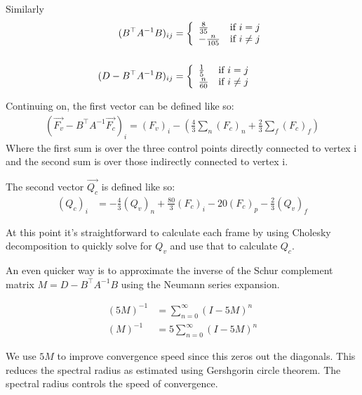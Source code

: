 \documentclass{article}
\begin{document}
Similarly
\begin{align*}
(B^{\top}A^{-1}B)_{ij} &= \left\{ 
  \begin{array}{l l}
    \frac{8}{35} & \text{if $i=j$}\\
    -\frac{n}{105} & \text{if $i\neq j$}\\
  \end{array} \right.  \\
  \\
(D-B^{\top}A^{-1}B)_{ij} &= \left\{ 
  \begin{array}{l l}
    \frac{1}{5} & \text{if $i=j$}\\
    \frac{n}{60} & \text{if $i\neq j$}\\
  \end{array} \right.  \\
\end{align*}

Continuing on, the first vector can be defined like so:
\begin{align*}
\left( \vec{F_v} - B^{\top}A^{-1}\vec{F_c} \right)_i= (F_v)_i - \left( \frac{4}{3} \sum_{n} (F_c)_n + \frac{2}{3} \sum_{f} (F_c)_f \right)
\end{align*}
Where the first sum is over the three control points directly connected to vertex i and the 
second sum is over those indirectly connected to vertex i. 

The second vector $\vec{Q_c}$ is defined like so:
\begin{align*}
(Q_c)_i &= -\frac{4}{3} (Q_v)_n + \frac{80}{3} (F_{c})_i - 20 (F_c)_{p} - \frac{2}{3} (Q_v)_f  
\end{align*}

At this point it's straightforward to calculate each frame by using Cholesky decomposition 
to quickly solve for $Q_v$ and use that to calculate $Q_c$.

An even quicker way is to approximate the inverse of the Schur complement matrix 
$M = D - B^{\top}A^{-1}B$ using the Neumann series expansion. 

\begin{align*}
(5M)^{-1} &= \sum_{n=0}^{\infty} (I - 5M)^{n}\\
(M)^{-1} &= 5\sum_{n=0}^{\infty} (I - 5M)^{n}
\end{align*}

We use $5M$ to improve convergence speed since this zeros out the diagonals. This reduces the spectral radius
as estimated using Gershgorin circle theorem. The spectral radius controls the speed of convergence.
\end{document}
